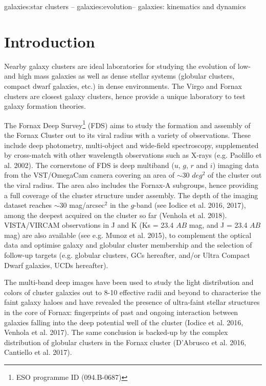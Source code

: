 \begin{keywords}
galaxies:star clusters -- galaxies:evolution-- galaxies: kinematics and dynamics
\end{keywords}

\section{Introduction}

Nearby galaxy clusters are ideal laboratories for studying the evolution of 
low- and high mass galaxies as well as dense stellar systems (globular 
clusters, compact dwarf galaxies, etc.) in dense environments. The Virgo and 
Fornax clusters are closest galaxy clusters, hence provide a unique laboratory 
to test galaxy formation theories. 

The Fornax Deep Survey\footnote{ESO programme ID (094.B-0687)} (FDS) aims to 
study the formation and assembly of the Fornax Cluster out to its viral radius 
with a variety of observations. These include
deep photometry, multi-object and wide-field spectroscopy, supplemented by 
cross-match with other wavelength observations such as  X-rays (e.g. Paolillo 
et al. 2002).
The cornerstone of FDS is deep multiband ($u$, $g$, $r$ and $i$) imaging data 
from the VST/OmegaCam camera covering an area of $\sim30$ $deg^2$ of the 
cluster out the viral radius. The area also includes the Fornax-A subgroups, 
hence providing a full coverage of the cluster structure under assembly.  The 
depth of the imaging dataset reaches $\sim 30$ mag/arcsec$^2$ in the $g$-band 
(see Iodice et al. 2016, 2017), among the deepest acquired on the cluster so 
far (Venhola et al. 2018). VISTA/VIRCAM observations in J and K (Ks = 23.4 $AB$ 
mag, and J = 23.4 $AB$ mag) are also available (see e.g. Munoz et al. 2015), to 
complement the optical data and optimise galaxy and globular cluster membership 
and the selection of follow-up targets (e.g. globular clusters, GCs hereafter, 
and/or Ultra Compact Dwarf galaxies, UCDs hereafter). 

The multi-band deep images have been used to study the light distribution and 
colors of cluster galaxies out to 8-10 effective radii and beyond to 
characterise the faint galaxy haloes and have revealed the presence of 
ultra-faint stellar structures in the core of Fornax: fingerprints of past and 
ongoing interaction between galaxies falling into the deep potential well of 
the cluster (Iodice et al. 2016, Venhola et al. 2017). The same conclusion is 
backed-up by the complex distribution of globular clusters in the Fornax 
cluster (D’Abrusco et al. 2016, Cantiello et al. 2017).

